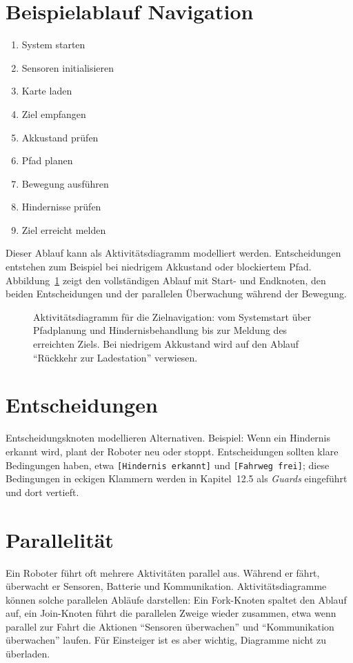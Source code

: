 \section{Beispielablauf Navigation}
\begin{enumerate}
    \item System starten
    \item Sensoren initialisieren
    \item Karte laden
    \item Ziel empfangen
    \item Akkustand prüfen
    \item Pfad planen
    \item Bewegung ausführen
    \item Hindernisse prüfen
    \item Ziel erreicht melden
\end{enumerate}

Dieser Ablauf kann als Aktivitätsdiagramm modelliert werden. Entscheidungen entstehen zum Beispiel bei niedrigem Akkustand oder blockiertem Pfad. Abbildung~\ref{fig:kap11-aktivitaet-zielnavigation} zeigt den vollständigen Ablauf mit Start- und Endknoten, den beiden Entscheidungen und der parallelen Überwachung während der Bewegung.

\begin{figure}[H]
  \centering
  
  \caption{Aktivitätsdiagramm für die Zielnavigation: vom Systemstart über Pfadplanung und Hindernisbehandlung bis zur Meldung des erreichten Ziels. Bei niedrigem Akkustand wird auf den Ablauf \enquote{Rückkehr zur Ladestation} verwiesen.}
  \label{fig:kap11-aktivitaet-zielnavigation}
\end{figure}

\section{Entscheidungen}
Entscheidungsknoten modellieren Alternativen. Beispiel: Wenn ein Hindernis erkannt wird, plant der Roboter neu oder stoppt. Entscheidungen sollten klare Bedingungen haben, etwa \texttt{[Hindernis erkannt]} und \texttt{[Fahrweg frei]}; diese Bedingungen in eckigen Klammern werden in Kapitel~12.5 als \emph{Guards} eingeführt und dort vertieft.

\section{Parallelität}
Ein Roboter führt oft mehrere Aktivitäten parallel aus. Während er fährt, überwacht er Sensoren, Batterie und Kommunikation. Aktivitätsdiagramme können solche parallelen Abläufe darstellen: Ein Fork-Knoten spaltet den Ablauf auf, ein Join-Knoten führt die parallelen Zweige wieder zusammen, etwa wenn parallel zur Fahrt die Aktionen \enquote{Sensoren überwachen} und \enquote{Kommunikation überwachen} laufen. Für Einsteiger ist es aber wichtig, Diagramme nicht zu überladen.


